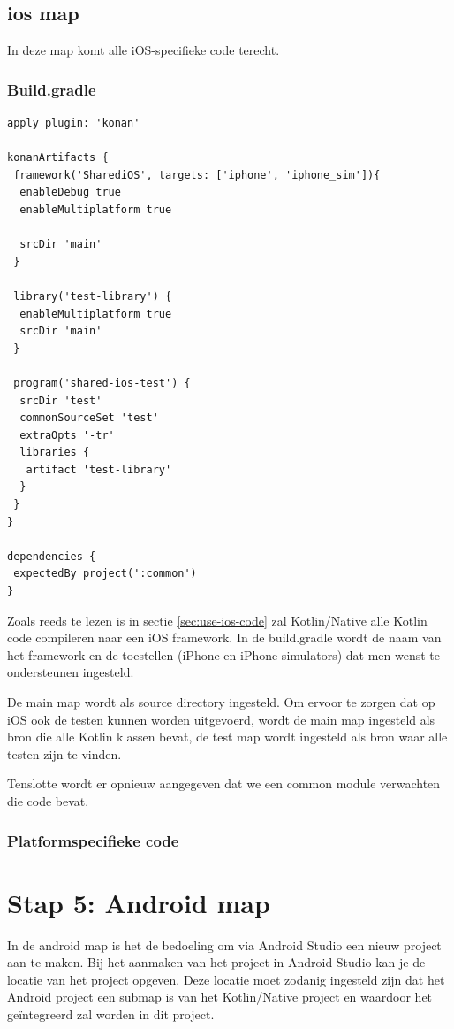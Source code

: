 \subsection{ios map}
In deze map komt alle iOS-specifieke code terecht.

\subsubsection{Build.gradle}
\label{sec:ios-build-gradle}
\begin{lstlisting}
apply plugin: 'konan'

konanArtifacts {
 framework('SharediOS', targets: ['iphone', 'iphone_sim']){
  enableDebug true
  enableMultiplatform true

  srcDir 'main'
 }

 library('test-library') {
  enableMultiplatform true
  srcDir 'main'
 }

 program('shared-ios-test') {
  srcDir 'test'
  commonSourceSet 'test'
  extraOpts '-tr'
  libraries {
   artifact 'test-library'
  }
 }
}

dependencies {
 expectedBy project(':common')
}
\end{lstlisting}

Zoals reeds te lezen is in sectie \ref{sec:use-ios-code} zal Kotlin/Native alle Kotlin code compileren naar een iOS framework. In de build.gradle wordt de naam van het framework en de toestellen (iPhone en iPhone simulators) dat men wenst te ondersteunen ingesteld.

De main map wordt als source directory ingesteld. Om ervoor te zorgen dat op iOS ook de testen kunnen worden uitgevoerd, wordt de main map ingesteld als bron die alle Kotlin klassen bevat, de test map wordt ingesteld als bron waar alle testen zijn te vinden.

Tenslotte wordt er opnieuw aangegeven dat we een common module verwachten die code bevat.

\subsubsection{Platformspecifieke code}

\section{Stap 5: Android map}
In de android map is het de bedoeling om via Android Studio een nieuw project aan te maken. Bij het aanmaken van het project in Android Studio kan je de locatie van het project opgeven. Deze locatie moet zodanig ingesteld zijn dat het Android project een submap is van het Kotlin/Native project en waardoor het geïntegreerd zal worden in dit project.

